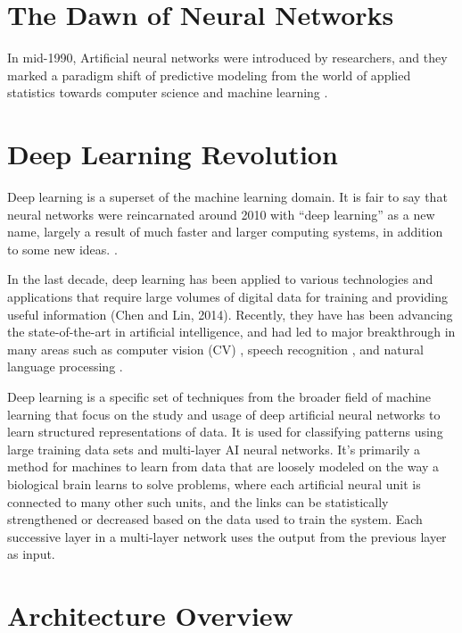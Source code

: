 \section{The Dawn of Neural Networks}
In mid-1990, Artificial neural networks were introduced by researchers, and they marked a paradigm shift of predictive modeling from the world of applied statistics towards computer science and machine learning \cite{efron2016computer}.

\section{Deep Learning Revolution}

Deep learning is a superset of the machine learning domain. It is fair to say that neural networks were reincarnated around 2010 with “deep learning” as a new name, largely a result of much faster and larger computing systems, in addition to some new ideas. \cite{efron2016computer}.


In the last decade, deep learning has been applied to various technologies and applications that require large volumes of digital data for training and providing useful information (Chen and Lin, 2014). Recently, they have has been advancing the state-of-the-art in artificial intelligence, and had led to major breakthrough in many areas such as computer vision (CV) \cite{krizhevsky2012imagenet} \cite{karpathy2014large}, speech recognition \cite{graves2013speech} \cite{mohamed2012acoustic}, and natural language processing \cite{bengio2003neural} \cite{mikolov2013distributed} \cite{mikolov2010recurrent}.

Deep learning \cite{Polson2018} is a specific set of techniques from the broader field of machine learning that focus on the study and usage of deep artificial neural networks to learn structured representations of data. It is used for classifying patterns using large training data sets and multi-layer AI neural networks. It's primarily a method for machines to learn from data that are loosely modeled on the way a biological brain learns to solve problems, where each artificial neural unit is connected to many other such units, and the links can be statistically strengthened or decreased based on the data used to train the system. Each successive layer in a multi-layer network uses the output from the previous layer as input.

\section{Architecture Overview}

